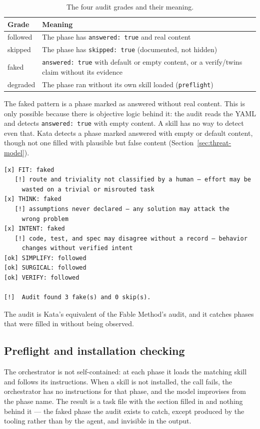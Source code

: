 \documentclass{sbc2019}%
\begin{document}
\begin{table}[!ht]
\caption{The four audit grades and their meaning.}
\centering
\begin{tabular}{@{}lp{5.2cm}@{}}
\hline\hline
Grade & Meaning \\
\hline
followed & The phase has \texttt{answered: true} and real content \\
skipped & The phase has \texttt{skipped: true} (documented, not hidden) \\
faked & \texttt{answered: true} with default or empty content, or a verify/twins claim without its evidence \\
degraded & The phase ran without its own skill loaded (\texttt{preflight}) \\
\hline\hline
\end{tabular}
\label{tab:grades}
\end{table}

The faked pattern is a phase
marked as answered without real content. This is only possible because
there is objective logic behind it:
the audit reads the YAML and detects \texttt{answered: true} with empty
content. A skill has no way to detect even that. Kata detects a phase marked
answered with empty or default content, though not one filled with plausible
but false content (Section~\ref{sec:threat-model}).

\begin{lstlisting}
[x] FIT: faked
   [!] route and triviality not classified by a human — effort may be
     wasted on a trivial or misrouted task
[x] THINK: faked
   [!] assumptions never declared — any solution may attack the
     wrong problem
[x] INTENT: faked
   [!] code, test, and spec may disagree without a record — behavior
     changes without verified intent
[ok] SIMPLIFY: followed
[ok] SURGICAL: followed
[ok] VERIFY: followed

[!]  Audit found 3 fake(s) and 0 skip(s).
\end{lstlisting}

The audit is Kata's equivalent of the Fable Method's audit, and it
catches phases that were filled in without being observed.

\subsection{Preflight and installation checking}

The orchestrator is not self-contained: at each phase it loads the matching
skill and follows its instructions. When a skill is not installed, the call
fails, the orchestrator has no instructions for that phase, and the model
improvises from the phase name. The result is a task file with the section
filled in and nothing behind it --- the faked phase the audit
exists to catch, except produced by the tooling rather than by the agent,
and invisible in the output.
\end{document}

